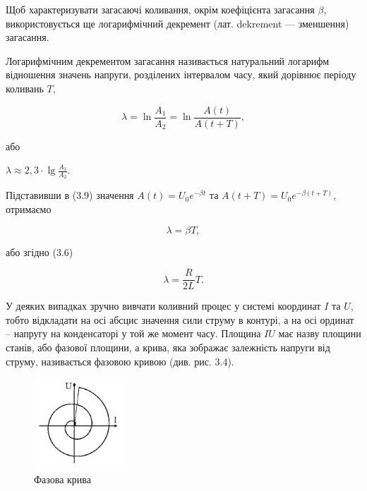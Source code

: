 \documentclass[12pt,a4paper]{article}
\begin{document}
    Щоб характеризувати загасаючі коливання, окрім коефіцієнта загасання $\beta$,
    використовується ще логарифмічний декремент (лат. dekrement --- зменшення) загасання.

    Логарифмічним декрементом загасання називається натуральний логарифм
    відношення значень напруги, розділених інтервалом часу,
    який дорівнює періоду коливань $T$,

    \begin{equation}
        \lambda = \ln \frac{A_1}{A_2} = \ln \frac{A(t)}{A(t+T)},
        \tag{3.9}
    \end{equation}

    або

    \begin{center}
        $\displaystyle \lambda \approx 2,3\cdot \lg \frac{A_1}{A_2}$.
    \end{center}

    Підставивши в (3.9) значення $A(t) = U_0e^{-\beta t}$ та $A(t+T) = U_0e^{-\beta (t+T)}$, отримаємо

    \begin{equation}
        \lambda = \beta T,
        \tag{3.10}
    \end{equation}

    або згідно (3.6)

    \begin{equation}
        \lambda = \frac{R}{2L}T.
        \tag{3.10а}
    \end{equation}

    У деяких випадках зручно вивчати коливний процес у системі координат $I$ та $U$,
    тобто відкладати на осі абсцис значення сили струму в контурі,
    а на осі ординат -- напругу на конденсаторі у той же момент часу.
    Площина $IU$ має назву площини станів, або фазової площини, а крива,
    яка зображає залежність напруги від струму, називається фазовою кривою (див. рис. 3.4).

    \begin{figure}[h!]

        \renewcommand{\thefigure}{3.\arabic{figure}} %

        \centering
        \includegraphics[width=0.3\textwidth]{3.4.png}
        \caption{Фазова крива}
        \label{fig4:schema}

    \end{figure}
\end{document}
